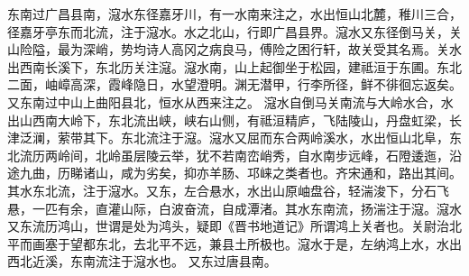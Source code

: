 \documentclass[12pt,UTF8]{ctexbook}
\begin{document}
东南过广昌县南，滱水东径嘉牙川，有一水南来注之，水出恒山北麓，稚川三合，径嘉牙亭东而北流，注于滱水。水之北山，行即广昌县界。滱水又东径倒马关，关山险隘，最为深峭，势均诗人高冈之病良马，傅险之困行轩，故关受其名焉。关水出西南长溪下，东北历关注滱。滱水南，山上起御坐于松园，建祗洹于东圃。东北二面，岫嶂高深，霞峰隐日，水望澄明。渊无潜甲，行李所径，鲜不徘徊忘返矣。又东南过中山上曲阳县北，恒水从西来注之。
滱水自倒马关南流与大岭水合，水出山西南大岭下，东北流出峡，峡右山侧，有祗洹精庐，飞陆陵山，丹盘虹梁，长津泛澜，萦带其下。东北流注于滱。滱水又屈而东合两岭溪水，水出恒山北阜，东北流历两岭间，北岭虽层陵云举，犹不若南峦峭秀，自水南步远峰，石隥逶迤，沿途九曲，历睇诸山，咸为劣矣，抑亦羊肠、邛崃之类者也。齐宋通和，路出其间。其水东北流，注于滱水。又东，左合悬水，水出山原岫盘谷，轻湍浚下，分石飞悬，一匹有余，直灌山际，白波奋流，自成潭渚。其水东南流，扬湍注于滱。滱水又东流历鸿山，世谓是处为鸿头，疑即《晋书地道记》所谓鸿上关者也。关尉治北平而画塞于望都东北，去北平不远，兼县土所极也。滱水于是，左纳鸿上水，水出西北近溪，东南流注于滱水也。
又东过唐县南。
\end{document}
